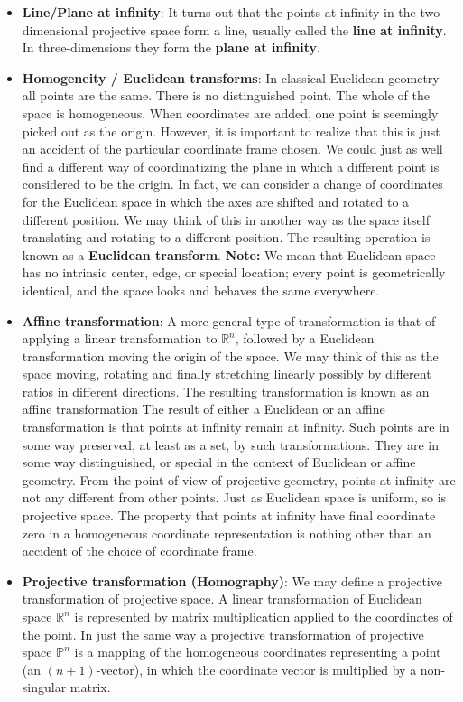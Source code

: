 \documentclass{report}
\begin{document}
\begin{itemize}
        \item \textbf{Line/Plane at infinity}: It turns out that the points at infinity in the two-dimensional projective space form a line, usually called the \textbf{line at infinity}. In three-dimensions they form the \textbf{plane at infinity}.
        \item \textbf{Homogeneity / Euclidean transforms}: In classical Euclidean geometry all points are the same. There is no distinguished point. The whole of the space is homogeneous. When coordinates are added, one point is seemingly picked out as the origin. However, it is important to realize that this is just an accident of the particular coordinate frame chosen. We could just as well find a different way of coordinatizing the plane in which a different point is considered to be the origin. In fact, we can consider a change of coordinates for the Euclidean space in which the axes are shifted and rotated to a different position. We may think of this in another way as the space itself translating and rotating to a different position. The resulting operation is known as a \textbf{Euclidean transform}.
            \bigbreak \noindent 
            \textbf{Note:} We mean that Euclidean space has no intrinsic center, edge, or special location; every point is geometrically identical, and the space looks and behaves the same everywhere.
        \item \textbf{Affine transformation}: A more general type of transformation is that of applying a linear transformation to $\mathbb{R}^{n}$, followed by a Euclidean transformation moving the origin of the space. We may think of this as the space moving, rotating and finally stretching linearly possibly by different ratios in different directions. The resulting transformation is known as an affine transformation
            \bigbreak \noindent 
            The result of either a Euclidean or an affine transformation is that points at infinity remain at infinity. Such points are in some way preserved, at least as a set, by such transformations. They are in some way distinguished, or special in the context of Euclidean or affine geometry.
            \bigbreak \noindent 
            From the point of view of projective geometry, points at infinity are not any different from other points. Just as Euclidean space is uniform, so is projective space. The property that points at infinity have final coordinate zero in a homogeneous coordinate representation is nothing other than an accident of the choice of coordinate frame.
        \item \textbf{Projective transformation (Homography)}: We may define a projective transformation of projective space. A linear transformation of Euclidean space $\mathbb{R}^{n}$ is represented by matrix multiplication applied to the coordinates of the point. In just the same way a projective transformation of projective space $\mathbb{P}^{n}$ is a mapping of the homogeneous coordinates representing a point (an $(n+1)$-vector), in which the coordinate vector is multiplied by a non-singular matrix. 

\end{itemize}
\end{document}
